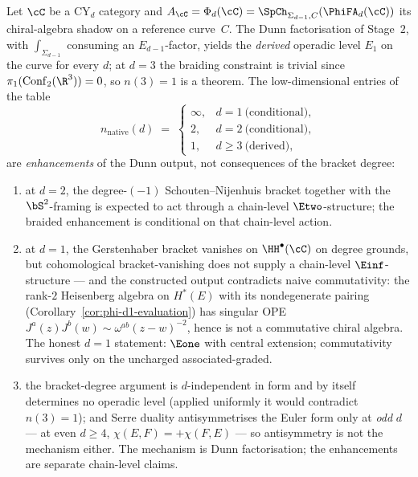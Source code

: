 \begin{proposition}
\label{prop:native-en-level}
Let $\cC$ be a CY$_d$ category and $A_\cC = \Phi_d(\cC) = \SpCh_{\Sigma_{d-1}, C}(\PhiFA_d(\cC))$ its chiral-algebra shadow on a reference curve~$C$. The Dunn factorisation of Stage~$2$, with $\int_{\Sigma_{d-1}}$ consuming an $E_{d-1}$-factor, yields the \emph{derived} operadic level $E_1$ on the curve for every $d$; at $d = 3$ the braiding constraint is trivial since $\pi_1(\mathrm{Conf}_2(\R^3)) = 0$, so $n(3) = 1$ is a theorem. The low-dimensional entries of the table
\[
 n_{\mathrm{native}}(d) \;=\; \begin{cases} \infty, & d = 1 \ \text{(conditional)}, \\ 2, & d = 2 \ \text{(conditional)}, \\ 1, & d \geq 3 \ \text{(derived)}, \end{cases}
\]
are \emph{enhancements} of the Dunn output, not consequences of the bracket degree:
\begin{enumerate}[label=\textup{(\roman*)}]
\item at $d = 2$, the degree-$(-1)$ Schouten--Nijenhuis bracket together with the $\bS^2$-framing is expected to act through a chain-level $\Etwo$-structure; the braided enhancement is conditional on that chain-level action.
\item at $d = 1$, the Gerstenhaber bracket vanishes on $\HH^\bullet(\cC)$ on degree grounds, but cohomological bracket-vanishing does not supply a chain-level $\Einf$-structure --- and the constructed output contradicts naive commutativity: the rank-$2$ Heisenberg algebra on $H^*(E)$ with its nondegenerate pairing \textup{(}Corollary~\ref{cor:phi-d1-evaluation}\textup{)} has singular OPE $J^a(z)J^b(w) \sim \omega^{ab}(z-w)^{-2}$, hence is not a commutative chiral algebra. The honest $d = 1$ statement: $\Eone$ with central extension; commutativity survives only on the uncharged associated-graded.
\item the bracket-degree argument is $d$-independent in form and by itself determines no operadic level (applied uniformly it would contradict $n(3) = 1$); and Serre duality antisymmetrises the Euler form only at \emph{odd} $d$ --- at even $d \geq 4$, $\chi(E, F) = +\chi(F, E)$ --- so antisymmetry is not the mechanism either. The mechanism is Dunn factorisation; the enhancements are separate chain-level claims.
\end{enumerate}
\end{proposition}

